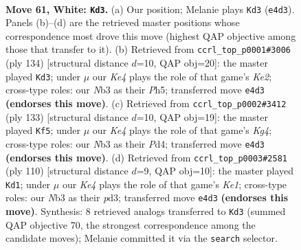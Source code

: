 \documentclass[11pt]{article}
\begin{document}
\clearpage

\begin{figure}[p]\centering
\begin{subfigure}{0.46\textwidth}\centering
\resizebox{\linewidth}{!}{%
\newchessgame
\chessboard[
  setfen={6k1/2P5/2r5/8/4KB2/1N6/8/8 w - - 35 61},
  showmover=false,
  pgfstyle=straightmove, color=movearrow, markmove={e4-d3}
]}
\caption{}
\end{subfigure}\hfill
\begin{subfigure}{0.46\textwidth}\centering
\resizebox{\linewidth}{!}{%
\newchessgame
\chessboard[
  setfen={8/1B6/2P5/2r4P/8/6k1/4K3/8 w - - 3 68},
  showmover=false,
  pgfstyle=straightmove, color=movearrow, markmove={e2-d3}
]}
\caption{}
\end{subfigure}
\\[4pt]
\begin{subfigure}{0.46\textwidth}\centering
\resizebox{\linewidth}{!}{%
\newchessgame
\chessboard[
  setfen={1b6/8/8/6k1/3p4/5K2/7p/7R b - - 7 67},
  showmover=false,
  pgfstyle=straightmove, color=movearrow, markmove={g5-f5}
]}
\caption{}
\end{subfigure}\hfill
\begin{subfigure}{0.46\textwidth}\centering
\resizebox{\linewidth}{!}{%
\newchessgame
\chessboard[
  setfen={3B4/8/8/5k2/7P/3p4/7r/4K3 w - - 3 56},
  showmover=false,
  pgfstyle=straightmove, color=movearrow, markmove={e1-d1}
]}
\caption{}
\end{subfigure}
\caption{\textbf{Move 61, White: \texttt{Kd3}.} (a) Our position; Melanie plays \texttt{Kd3} (\texttt{e4d3}). Panels (b)--(d) are the retrieved master positions whose correspondence most drove this move (highest QAP objective among those that transfer to it). (b) Retrieved from \texttt{ccrl\_top\_p0001\#3006} (ply 134) [structural distance $d$=10, QAP obj=20]: the master played \texttt{Kd3}; under $\mu$ our \emph{Ke4} plays the role of that game's \emph{Ke2}; cross-type roles: our \emph{N}b3 as their \emph{P}h5; transferred move \texttt{e4d3} \textbf{(endorses this move)}. (c) Retrieved from \texttt{ccrl\_top\_p0002\#3412} (ply 133) [structural distance $d$=10, QAP obj=19]: the master played \texttt{Kf5}; under $\mu$ our \emph{Ke4} plays the role of that game's \emph{Kg4}; cross-type roles: our \emph{N}b3 as their \emph{P}d4; transferred move \texttt{e4d3} \textbf{(endorses this move)}. (d) Retrieved from \texttt{ccrl\_top\_p0003\#2581} (ply 110) [structural distance $d$=9, QAP obj=10]: the master played \texttt{Kd1}; under $\mu$ our \emph{Ke4} plays the role of that game's \emph{Ke1}; cross-type roles: our \emph{N}b3 as their \emph{p}d3; transferred move \texttt{e4d3} \textbf{(endorses this move)}. Synthesis: 8 retrieved analogs transferred to \texttt{Kd3} (summed QAP objective 70, the strongest correspondence among the candidate moves); Melanie committed it via the \texttt{search} selector.}
\label{fig:thought-m120}
\end{figure}
\end{document}
